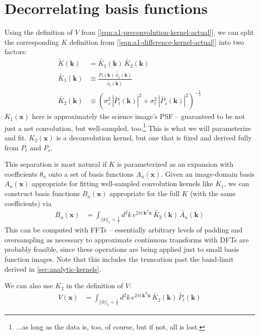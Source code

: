 \documentclass[DM,authoryear,toc]{lsstdoc}
\begin{document}
\section{Decorrelating basis functions}

Using the definition of $V$ from [\ref{eqn:a1-preconvolution-kernel-actual}], we can split the corresponding $K$ definition from [\ref{eqn:a1-difference-kernel-actual}] into two factors:
\begin{align}
  \widetilde{K}(\symbf{k}) & = \widetilde{K_1}(\symbf{k}) \, \widetilde{K_2}(\symbf{k}) \\
  \widetilde{K_1}(\symbf{k}) & \equiv
  \frac{
      \widetilde{P_t}(\symbf{k}) \, \widetilde{\phi_s}(\symbf{k})
  }{
    \widetilde{\phi_t}(\symbf{k}) \,
  } \\
  \widetilde{K_2}(\symbf{k}) & \equiv \left(
      \sigma_s^2 \, \left|\widetilde{P_t}(\symbf{k})\right|^2
      + \sigma_t^2 \, \left|\widetilde{P_s}(\symbf{k})\right|^2
    \right)^{-\frac{1}{2}}
\end{align}
$K_1(\symbf{x})$ here is approximately the science image's PSF -- guaranteed to be not just a net convolution, but well-sampled, too.\footnote{...as long as the data is, too, of course, but if not, all is lost.}
This is what we will parameterize and fit.
$K_2(\symbf{x})$ is a deconvolution kernel, but one that is fixed and derived fully from $P_t$ and $P_s$.

This separation is most natural if $K$ is parameterized as an expansion with coefficients $\theta_n$ onto a set of basis functions $A_n(\symbf{x})$.
Given an image-domain basis $A_n(\symbf{x})$ appropriate for fitting well-sampled convolution kernels like $K_1$, we can construct basis functions $B_n(\symbf{x})$ appropriate for the full $K$ (with the same coefficients) via
\begin{align}
  B_n(\symbf{x}) & = \int_{||k||_1 < \frac{1}{2}} \! d^2 k \,
    e^{2\pi i \, \symbf{k}^T\!\symbf{x}} \, \widetilde{K_2}(\symbf{k}) \, \widetilde{A_n}(\symbf{k})
  \label{eqn:decorrelating-basis}
\end{align}
This can be computed with FFTs -- essentially arbitrary levels of padding and oversampling as necessary to approximate continuous transforms with DFTs are probably feasible, since these operations are being applied just to small basis function images.
Note that this includes the truncation past the band-limit derived in \ref{sec:analytic-kernels}.

We can also use $K_2$ in the definition of $V$:
\begin{align}
  V(\symbf{x}) & = \int_{||k||_1 < \frac{1}{2}} \! d^2 k \,
  e^{2\pi i \, \symbf{k}^T\!\symbf{x}} \, \widetilde{K_2}(\symbf{k}) \, \widetilde{P_t}(\symbf{k})
\end{align}
\end{document}
